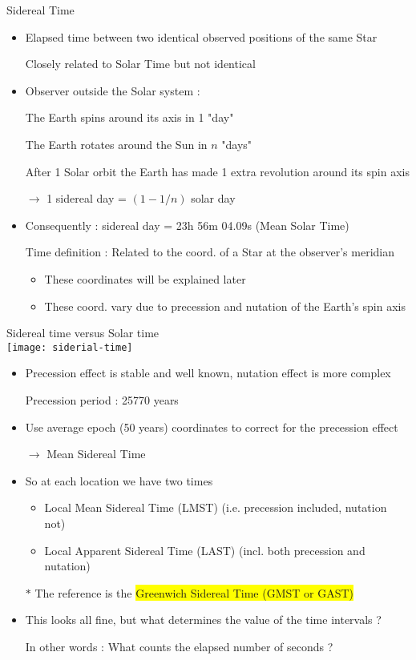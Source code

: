 \Tr
\begin{center}
{\red Sidereal Time}
\end{center}
%
\begin{itemize}
\item {\blue Elapsed time between two identical observed positions of the same Star}
\item[] Closely related to Solar Time but not identical
\item Observer outside the Solar system :
\item[] The Earth spins around its axis in 1 "day"
\item[] The Earth rotates around the Sun in $n$ "days"
\item[] After 1 Solar orbit the Earth has made 1 extra revolution around its spin axis
\item[] $\rightarrow$ 1 sidereal day = $(1-1/n)$ solar day
\item Consequently : { sidereal day = 23h 56m 04.09s (Mean Solar Time)}
\item[] Time definition : Related to the coord. of a Star at the observer's meridian
\begin{itemize}
\item These coordinates will be explained later
\item These coord. vary due to precession and nutation of the Earth's spin axis
\end{itemize}
\end{itemize}

\Tr
\onecolumn
\begin{center}
{\blue Sidereal time versus Solar time}\\[3mm]
\texttt{[image: siderial-time]}
\end{center}

\Tr
\begin{itemize}
\item Precession effect is stable and well known, nutation effect is more complex
\item[] Precession period : 25770 years
\item Use average epoch (50 years) coordinates to correct for the precession effect
\item[] $\rightarrow$ {\blue Mean Sidereal Time}
\item So at each location we have two times
\begin{itemize}
\item {\blue Local Mean Sidereal Time (LMST)} (i.e. precession included, nutation not)
\item {\blue Local Apparent Sidereal Time (LAST)} (incl. both precession and nutation)
\end{itemize}
\item[$\ast$] The reference is the \colorbox{yellow}{Greenwich Sidereal Time (GMST or GAST)} 
\item This looks all fine, but what determines the value of the time intervals ?
\item[] In other words : {\blue What counts the elapsed number of seconds ?}
\end{itemize}

